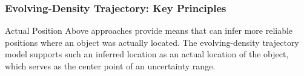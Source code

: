 \begin{frame}
\frametitle{Evolving-Density Trajectory: Key Principles}


\begin{block}{Actual Position}
  Above approaches provide means that can infer more reliable positions where an object was actually located. The evolving-density trajectory model supports such an inferred location as an actual location of the object, which serves as the center point of an uncertainty range.
\end{block}

\end{frame}



